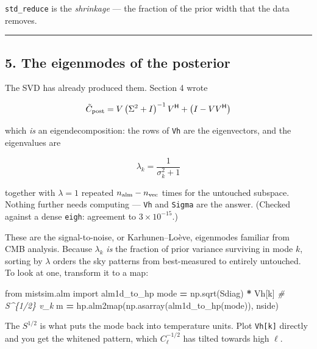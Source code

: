 \documentclass[
  11pt,
]{article}
\newenvironment{Shaded}{\begin{snugshade}}{\end{snugshade}}
\newcommand{\CommentTok}[1]{\textcolor[rgb]{0.56,0.35,0.01}{\textit{#1}}}
\newcommand{\ImportTok}[1]{#1}
\newcommand{\NormalTok}[1]{#1}
\newcommand{\OperatorTok}[1]{\textcolor[rgb]{0.81,0.36,0.00}{\textbf{#1}}}
\begin{document}
\texttt{std\_reduce} is the \emph{shrinkage} --- the fraction of the
prior width that the data removes.

\begin{center}\rule{0.5\linewidth}{0.5pt}\end{center}

\hypertarget{5-the-eigenmodes-of-the-posterior}{%
\subsection{5. The eigenmodes of the
posterior}\label{5-the-eigenmodes-of-the-posterior}}

The SVD has already produced them. Section 4 wrote

\[ \tilde{C}_{\rm post} = V\left(\Sigma^2+I\right)^{-1}V^{\mathsf H} + \left(I - VV^{\mathsf H}\right) \]

which \emph{is} an eigendecomposition: the rows of \texttt{Vh} are the
eigenvectors, and the eigenvalues are

\[ \lambda_k = \frac{1}{\sigma_k^2+1} \]

together with \(\lambda = 1\) repeated \(n_{\rm alm} - n_{\rm vec}\)
times for the untouched subspace. Nothing further needs computing ---
\texttt{Vh} and \texttt{Sigma} are the answer. (Checked against a dense
\texttt{eigh}: agreement to \(3\times10^{-15}\).)

These are the signal-to-noise, or Karhunen--Loève, eigenmodes familiar
from CMB analysis. Because \(\lambda_k\) \emph{is} the fraction of prior
variance surviving in mode \(k\), sorting by \(\lambda\) orders the sky
patterns from best-measured to entirely untouched. To look at one,
transform it to a map:

\begin{Shaded}
\begin{Highlighting}[]
\ImportTok{from}\NormalTok{ mistsim.alm }\ImportTok{import}\NormalTok{ alm1d\_to\_hp}
\NormalTok{mode }\OperatorTok{=}\NormalTok{ np.sqrt(Sdiag) }\OperatorTok{*}\NormalTok{ Vh[k]                       }\CommentTok{\# S\^{}\{1/2\} v\_k}
\NormalTok{m }\OperatorTok{=}\NormalTok{ hp.alm2map(np.asarray(alm1d\_to\_hp(mode)), nside)}
\end{Highlighting}
\end{Shaded}

The \(S^{1/2}\) is what puts the mode back into temperature units. Plot
\texttt{Vh{[}k{]}} directly and you get the whitened pattern, which
\(C_\ell^{-1/2}\) has tilted towards high \(\ell\).
\end{document}
